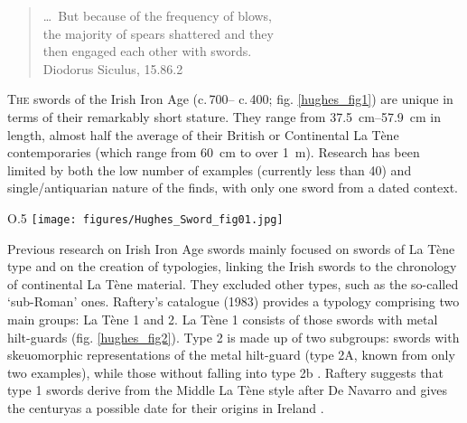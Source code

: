 \begin{quote}
\begin{flushright}
\ldots\ But because of the frequency of blows, \\
the majority of spears shattered and they\\
then engaged each other with swords.\\
{\footnotesize Diodorus Siculus, 15.86.2  }
\end{flushright}
\end{quote}
\vspace{2em}


\lettrine[nindent=0em,lines=3]{T}{he}  swords of the Irish Iron Age (c.\,700\BC – c.\,400\AD; fig. \ref{hughes_fig1}) are unique in terms of their remarkably short stature. They range from \SIrange[range-phrase= --]{37.5}{57.9}{\cm} in length, almost half the average of their British or Continental La Tène contemporaries (which range from \SI{60}{\cm} to over \SI{1}{\meter}). 
Research has been limited by both the low number of examples (currently less than \num{40}) and single/antiquarian nature of the finds, with only one sword from a dated context. 

\begin{wrapfigure}{O}{.5\textwidth}
\texttt{[image: figures/Hughes\_Sword\_fig01.jpg]} 
\caption{Distribution of Iron Age swords in Ireland and main sites mentioned in the text}
\label{hughes_fig1}
\end{wrapfigure}
Previous research on Irish Iron Age swords \parencites{Rynne1982}{Raftery1983} mainly focused on swords of La Tène type and on the creation of typologies, linking the Irish swords to the chronology of continental La Tène material. 
They excluded other types, such as the so-called ‘sub-Roman’ ones. 
Raftery’s catalogue (1983) provides a typology comprising two main groups: 
La Tène 1 and 2. La Tène 1 consists of those swords with metal hilt-guards (fig. \ref{hughes_fig2}). 
Type 2 is made up of two subgroups: 
swords with skeuomorphic representations of the metal hilt-guard (type 2A, known from only two examples), while those without falling into type 2b 
\parencite[83--106]{Raftery1983}. 
Raftery suggests that type 1 swords derive from the Middle La Tène style after De Navarro and gives the  century\BC as a possible date for their origins in Ireland 
\parencites{DeNavarro1972}[83]{Raftery1983}. 

